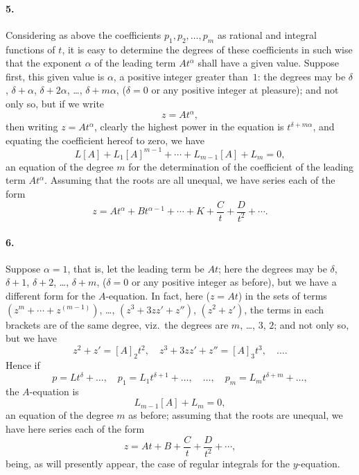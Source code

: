 \documentclass[11pt,a4paper]{article}
\theoremstyle{definition}
\begin{document}
\paragraph{5.} Considering as above the coefficients $p_{1}, p_{2}, \ldots, p_{m}$ as rational and integral functions of $t$, it is easy to determine the degrees of these coefficients in such wise that the exponent $\alpha$ of the leading term $At^{\alpha}$ shall have a given value. Suppose first, this given value is $\alpha$, a positive integer greater than~$1$: the degrees may be $\delta$, $\delta + \alpha$, $\delta + 2\alpha$, \ldots, $\delta + m\alpha$, ($\delta = 0$ or any positive integer at pleasure); and not only so, but if we write
\[
z = At^{\alpha},
\]
then writing $z = At^{\alpha}$, clearly the highest power in the equation is $t^{\delta + m\alpha}$, and equating the coefficient hereof to zero, we have
\[
L[A] + L_{1}[A]^{m-1} + \cdots + L_{m-1}[A] + L_{m} = 0,
\]
an equation of the degree $m$ for the determination of the coefficient of the leading term $At^{\alpha}$. Assuming that the roots are all unequal, we have series each of the form
\[
z = At^{\alpha} + Bt^{\alpha-1} + \cdots + K + \frac{C}{t} + \frac{D}{t^{2}} + \cdots.
\]

\paragraph{6.} Suppose $\alpha = 1$, that is, let the leading term be $At$; here the degrees may be $\delta$, $\delta + 1$, $\delta + 2$, \ldots, $\delta + m$, ($\delta = 0$ or any positive integer as before), but we have a different form for the $A$-equation. In fact, here ($z = At$) in the sets of terms $(z^{m} + \cdots + z^{(m-1)})$, \ldots, $(z^{3} + 3zz' + z'')$, $(z^{2} + z')$, the terms in each brackets are of the same degree, viz.\ the degrees are $m$, \ldots, $3$, $2$; and not only so, but we have
\[
z^{2} + z' = [A]_{2}t^{2}, \quad z^{3} + 3zz' + z'' = [A]_{3}t^{3}, \quad \ldots.
\]
Hence if
\[
p = Lt^{\delta} + \ldots, \quad p_{1} = L_{1}t^{\delta+1} + \ldots, \quad \ldots, \quad p_{m} = L_{m}t^{\delta+m} + \ldots,
\]
the $A$-equation is
\[
L_{m-1}[A] + L_{m} = 0,
\]
an equation of the degree $m$ as before; assuming that the roots are unequal, we have here series each of the form
\[
z = At + B + \frac{C}{t} + \frac{D}{t^{2}} + \cdots,
\]
being, as will presently appear, the case of regular integrals for the $y$-equation.
\end{document}
